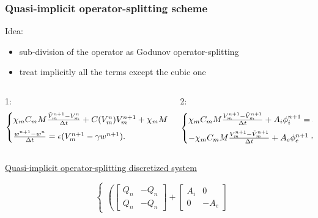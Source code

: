 \documentclass[9pt]{beamer}
\begin{document}
\begin{frame}
\frametitle{Quasi-implicit operator-splitting scheme}
Idea:
\begin{itemize}
\item sub-division of the operator as Godunov operator-splitting
\item treat implicitly all the terms except the cubic one
\end{itemize}
\vspace{2mm}
\begin{columns}
            \begin{column}{0.5\textwidth}
\small 1:
 \begin{equation*}
\begin{cases}
\chi_m C_m M \frac{\tilde{V}_m^{n+1}-V_m^n}{\Delta t} +  C(V_m^n) V_m^{n+1} + \chi_m M w^{n+1}= 0,\vspace{2mm}\\
\frac{w^{n+1} - w^n}{\Delta t} = \epsilon (V_m^{n+1}-\gamma w^{n+1}).
\end{cases}
\end{equation*}
            \end{column}
            \hspace{1cm}
            \begin{column}{0.5\textwidth}  
            \small 2:
\begin{equation*}
\begin{cases}
\chi_m C_m M \frac{V_m^{n+1}-\tilde{V}_m^{n+1}}{\Delta t} + A_i \phi_i^{n+1}= F_i^{n+1},\vspace{2mm}\\
- \chi_m C_m M \frac{V_m^{n+1}-\tilde{V}_m^{n+1}}{\Delta t} + A_e \phi_e^{n+1}= F_e^{n+1}.
\end{cases}
\end{equation*}
            \end{column}
     \end{columns}
\vspace{3mm}
\begin{center}
\underline{Quasi-implicit operator-splitting discretized system}
\end{center}
\begin{equation*}
\quad
\begin{cases}
\left(
\begin{bmatrix} Q_n & -Q_n \\ Q_n & -Q_n \end{bmatrix} + 
\begin{bmatrix} A_i & 0 \\ 0 & -A_e\end{bmatrix}

\end{cases}
\end{equation*}
\end{frame}
\end{document}
